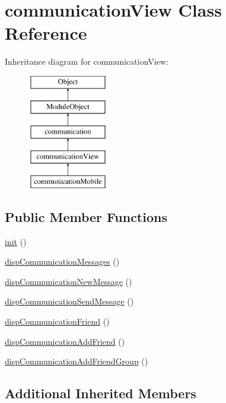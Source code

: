 \hypertarget{classcommunicationView}{}\section{communication\+View Class Reference}
\label{classcommunicationView}
Inheritance diagram for communication\+View\+:\begin{figure}[H]
\begin{center}
\leavevmode
\includegraphics[height=5.000000cm]{classcommunicationView}
\end{center}
\end{figure}
\subsection*{Public Member Functions}
\begin{DoxyCompactItemize}
\item 
\hyperlink{classcommunicationView_abf9303274b2b073771fa7564247b160c}{init} ()
\item 
\hyperlink{classcommunicationView_af3af3334ae9f2e3a7809fe5b4957bc2b}{disp\+Communication\+Messages} ()
\item 
\hyperlink{classcommunicationView_a3f0afc676b2ea9ee123f86fc362aeb19}{disp\+Communication\+New\+Message} ()
\item 
\hyperlink{classcommunicationView_a7c9525d8c0851708e5b768df15e61bf6}{disp\+Communication\+Send\+Message} ()
\item 
\hyperlink{classcommunicationView_a676e4e4ab5900c536557befbbde6a88a}{disp\+Communication\+Friend} ()
\item 
\hyperlink{classcommunicationView_a481636c7776213713b950a827aa6f728}{disp\+Communication\+Add\+Friend} ()
\item 
\hyperlink{classcommunicationView_a6675ce671029732a7d5d6428287ddd4b}{disp\+Communication\+Add\+Friend\+Group} ()
\end{DoxyCompactItemize}
\subsection*{Additional Inherited Members}


